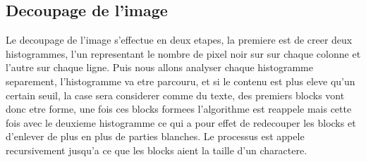 \subsection{Decoupage de l'image}
Le decoupage de l'image s'effectue en deux etapes, la premiere est de creer deux histogrammes, l'un representant le nombre de pixel noir sur sur chaque colonne et l'autre sur chaque ligne. Puis nous allons analyser chaque histogramme separement, l'histogramme va etre parcouru, et si le contenu est plus eleve qu'un certain seuil, la case sera considerer comme du texte, des premiers blocks vont donc etre forme, une fois ces blocks formees l'algorithme est reappele mais cette fois avec le deuxieme histogramme ce qui a pour effet de redecouper les blocks et d'enlever de plus en plus de parties blanches. Le processus est appele recursivement jusqu'a ce que les blocks aient la taille d'un charactere.
